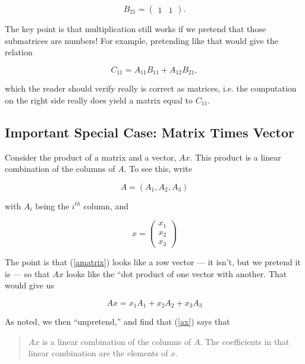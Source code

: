 \begin{equation}
B_{21} =
\left (
\begin{array}{cc}
1 & 1
\end{array}
\right ) .
\end{equation}

The key point is that multiplication still works if we pretend that
those submatrices are numbers!  For example, pretending like that would
give the relation

\begin{equation}
C_{11} = A_{11} B_{11} + A_{12} B_{21}, 
\end{equation}

which the reader should verify really is correct as matrices, i.e. the
computation on the right side really does yield a matrix equal to $C_{11}$.

\subsection{Important Special Case:  Matrix Times Vector}
\label{matxvec}

Consider the product of a matrix and a vector, $Ax$.  This product is a
linear combination of the columns of $A$.  To see this, write

\begin{equation}
\label{amatrix}
A = (A_1, A_2, A_3)
\end{equation}

with $A_i$ being the $i^{th}$ column, and

\begin{equation}
x = 
\left ( 
\begin{array}{c}
x_1 \\
x_2 \\
x_3
\end{array}
\right )
\end{equation}

The point is that (\ref{amatrix}) looks like a row vector --- it isn't,
but we pretend it is --- so that $Ax$ looks like the ``dot product of
one vector with another.  That would give us

\begin{equation}
\label{ax}
Ax = x_1 A_1 + x_2 A_2 + x_3 A_3
\end{equation}

As noted, we then ``unpretend,'' and find that (\ref{ax}) says that

\begin{quote}
$Ax$ is a linear combination of the columns of $A$.  The coefficients in
that linear combination are the elements of $x$.
\end{quote}

